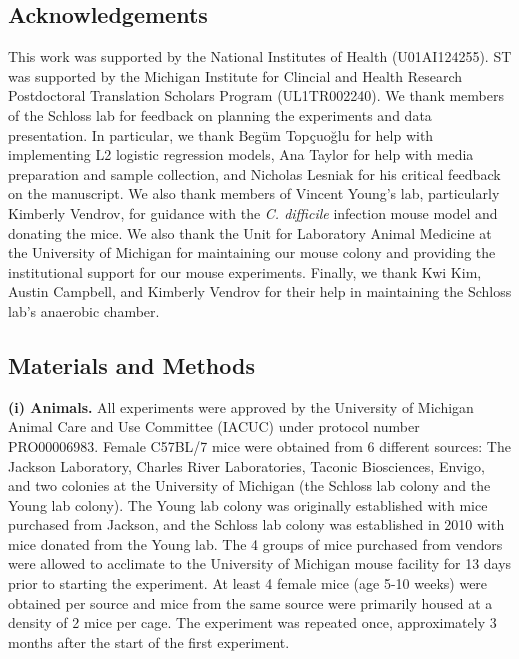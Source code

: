 \documentclass[
  11pt,
]{article}
\begin{document}
\newpage

\hypertarget{acknowledgements}{%
\subsection{Acknowledgements}\label{acknowledgements}}

This work was supported by the National Institutes of Health
(U01AI124255). ST was supported by the Michigan Institute for Clincial
and Health Research Postdoctoral Translation Scholars Program
(UL1TR002240). We thank members of the Schloss lab for feedback on
planning the experiments and data presentation. In particular, we thank
Begüm Topçuoğlu for help with implementing L2 logistic regression
models, Ana Taylor for help with media preparation and sample
collection, and Nicholas Lesniak for his critical feedback on the
manuscript. We also thank members of Vincent Young's lab, particularly
Kimberly Vendrov, for guidance with the \emph{C. difficile} infection
mouse model and donating the mice. We also thank the Unit for Laboratory
Animal Medicine at the University of Michigan for maintaining our mouse
colony and providing the institutional support for our mouse
experiments. Finally, we thank Kwi Kim, Austin Campbell, and Kimberly
Vendrov for their help in maintaining the Schloss lab's anaerobic
chamber.

\newpage

\hypertarget{materials-and-methods}{%
\subsection{Materials and Methods}\label{materials-and-methods}}

\textbf{(i) Animals.} All experiments were approved by the University of
Michigan Animal Care and Use Committee (IACUC) under protocol number
PRO00006983. Female C57BL/7 mice were obtained from 6 different sources:
The Jackson Laboratory, Charles River Laboratories, Taconic Biosciences,
Envigo, and two colonies at the University of Michigan (the Schloss lab
colony and the Young lab colony). The Young lab colony was originally
established with mice purchased from Jackson, and the Schloss lab colony
was established in 2010 with mice donated from the Young lab. The 4
groups of mice purchased from vendors were allowed to acclimate to the
University of Michigan mouse facility for 13 days prior to starting the
experiment. At least 4 female mice (age 5-10 weeks) were obtained per
source and mice from the same source were primarily housed at a density
of 2 mice per cage. The experiment was repeated once, approximately 3
months after the start of the first experiment.
\end{document}
